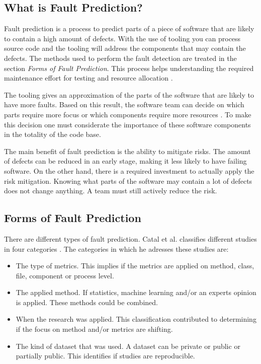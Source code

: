 \subsection*{What is Fault Prediction?}

Fault prediction is a process to predict parts of a piece of software that are likely to contain a high amount of defects.
With the use of tooling you can process source code and the tooling will address the components that may contain the defects.
The methods used to perform the fault detection are treated in the section \textit{Forms of Fault Prediction}.
This process helps understanding the required maintenance effort for testing and resource allocation \autocite[415]{MAKING_SOFTWARE}.

The tooling gives an approximation of the parts of the software that are likely to have more faults.
Based on this result, the software team can decide on which parts require more focus or which components require more resources \autocite[415-416]{MAKING_SOFTWARE}.
To make this decision one must considerate the importance of these software components in the totality of the code base.

The main benefit of fault prediction is the ability to mitigate risks.
The amount of defects can be reduced in an early stage, making it less likely to have failing software.
On the other hand, there is a required investment to actually apply the risk mitigation.
Knowing what parts of the software may contain a lot of defects does not change anything.
A team must still actively reduce the risk.

\subsection*{Forms of Fault Prediction}

There are different types of fault prediction. Catal et al. classifies different studies in four categories \autocite{Catal20097346}. The categories in which he adresses these studies are:
\begin{itemize}
\setlength\itemsep{0em}
\item The type of metrics. This implies if the metrics are applied on method, class, file, component or process level.
\item The applied method. If statistics, machine learning and/or an experts opinion is applied. These methods could be combined.
\item When the research was applied. This classification contributed to determining if the focus on method and/or metrics are shifting.
\item The kind of dataset that was used. A dataset can be private or public or partially public. This identifies if studies are reproducible.
\end{itemize}

